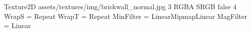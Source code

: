 Texture2D
assets/textures/img/brickwall_normal.jpg
3
RGBA
SRGB
false
4
WrapS = Repeat
WrapT = Repeat
MinFilter = LinearMipmapLinear
MagFilter = Linear
